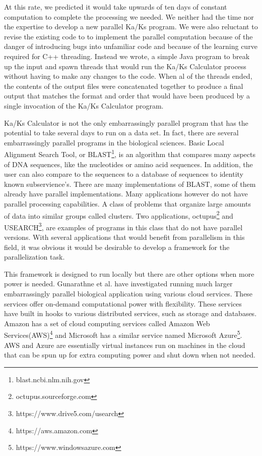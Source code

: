 \documentclass[12pt]{article}
\begin{document}
At this rate, we predicted it would take upwards of ten days of constant
computation to complete the processing we needed. We neither had the time nor
the expertise to develop a new parallel Ka/Ks program. We were also reluctant to
revise the existing code to to implement the parallel computation because of the
danger of introducing bugs into unfamiliar code and because of the learning
curve required for C++ threading. Instead we wrote, a simple Java program to
break up the input and spawn threads that would run the Ka/Ks Calculator process
without having to make any changes to the code. When al of the threads ended,
the contents of the output files were concatenated together to produce a final
output that matches the format and order that would have been produced by a
single invocation of the Ka/Ks Calculator program.

Ka/Ks Calculator is not the only embarrassingly parallel program that has the
potential to take several days to run on a data set. In fact, there are several
embarrassingly parallel programs in the biological sciences. Basic Local
Alignment Search Tool, or BLAST\footnote{blast.ncbi.nlm.nih.gov}, is an
algorithm that compares many aspects of DNA sequences, like the nucleotides or
amino acid sequences. In addition, the user can also compare to the sequences to
a database of sequences to identity known subservience's. There are many
implementations of BLAST, some of them already have parallel implementations.
Many applications however do not have parallel processing capabilities. A class
of problems that organize large amounts of data into similar groups called
clusters. Two applications, octupus\footnote{octupus.sourceforge.com} and
USEARCH\footnote{https://www.drive5.com/usearch}, are examples of programs in
this class that do not have parallel versions. With several applications that
would benefit from parallelism in this field, it was obvious it would be
desirable to develop a framework for the parallelization task.

This framework is designed to run locally but there are other options when more
power is needed. Gunarathne et al.\cite{cloud} have investigated running much
larger embarrassingly parallel biological application using various cloud
services. These services offer on-demand computational power with flexibility.
These services have built in hooks to various distributed services, such as
storage and databases. Amazon has a set of cloud computing services called
Amazon Web Services(AWS)\footnote{https://aws.amazon.com} and Microsoft has a
similar service named Microsoft Azure\footnote{https://www.windowsazure.com}.
AWS and Azure are essentially virtual instances run on machines in the cloud that
can be spun up for extra computing power and shut down when not needed. 
\end{document}
